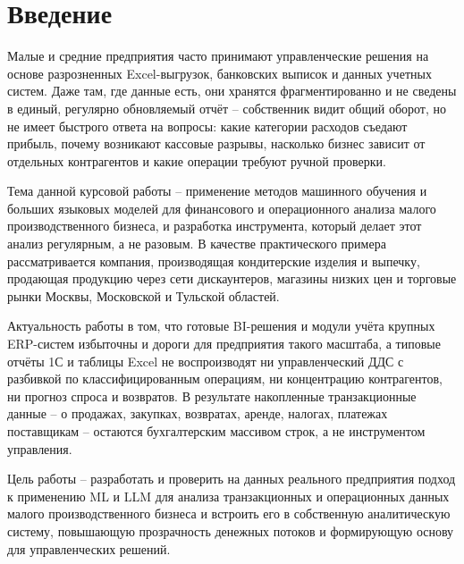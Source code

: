 \chapter*{Введение}

Малые и средние предприятия часто принимают управленческие решения на основе разрозненных Excel-выгрузок, банковских выписок и данных учетных систем. Даже там, где данные есть, они хранятся фрагментированно и не сведены в единый, регулярно обновляемый отчёт -- собственник видит общий оборот, но не имеет быстрого ответа на вопросы: какие категории расходов съедают прибыль, почему возникают кассовые разрывы, насколько бизнес зависит от отдельных контрагентов и какие операции требуют ручной проверки.

Тема данной курсовой работы -- применение методов машинного обучения и больших языковых моделей для финансового и операционного анализа малого производственного бизнеса, и разработка инструмента, который делает этот анализ регулярным, а не разовым. В качестве практического примера рассматривается компания, производящая кондитерские изделия и выпечку, продающая продукцию через сети дискаунтеров, магазины низких цен и торговые рынки Москвы, Московской и Тульской областей.

Актуальность работы в том, что готовые BI-решения и модули учёта крупных ERP-систем избыточны и дороги для предприятия такого масштаба, а типовые отчёты 1С и таблицы Excel не воспроизводят ни управленческий ДДС с разбивкой по классифицированным операциям, ни концентрацию контрагентов, ни прогноз спроса и возвратов. В результате накопленные транзакционные данные -- о продажах, закупках, возвратах, аренде, налогах, платежах поставщикам -- остаются бухгалтерским массивом строк, а не инструментом управления.

Цель работы -- разработать и проверить на данных реального предприятия подход к применению ML и LLM для анализа транзакционных и операционных данных малого производственного бизнеса и встроить его в собственную аналитическую систему, повышающую прозрачность денежных потоков и формирующую основу для управленческих решений.

